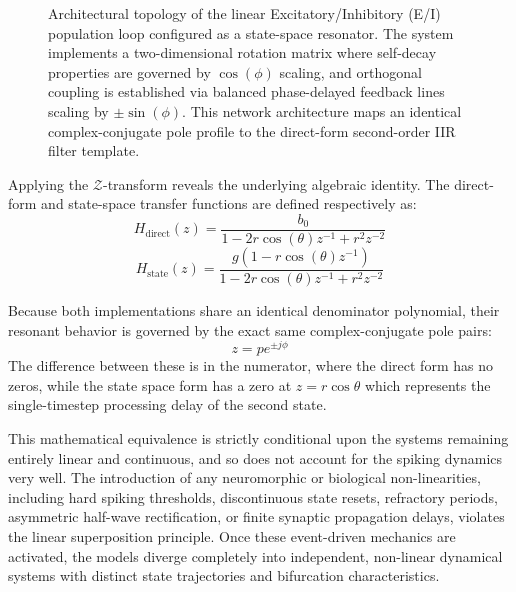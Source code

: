 \begin{figure}[htbp]
    \caption{Architectural topology of the linear Excitatory/Inhibitory (E/I) population loop configured as a state-space resonator. The system implements a two-dimensional rotation matrix where self-decay properties are governed by $\cos(\phi)$ scaling, and orthogonal coupling is established via balanced phase-delayed feedback lines scaling by $\pm\sin(\phi)$. This network architecture maps an identical complex-conjugate pole profile to the direct-form second-order IIR filter template.}
    \label{fig:ei_population_resonator}
\end{figure}


Applying the $\mathcal{Z}$-transform reveals the underlying algebraic identity. The direct-form and state-space transfer functions are defined respectively as:
\begin{equation}
    H_{\text{direct}}(z) = \frac{b_0}{1 - 2r\cos(\theta)z^{-1} + r^2z^{-2}}
\end{equation}
\begin{equation}
    H_{\text{state}}(z) = \frac{g(1 - r\cos(\theta)z^{-1})}{1 - 2r\cos(\theta)z^{-1} + r^2z^{-2}}
\end{equation}

Because both implementations share an identical denominator polynomial, their resonant behavior is governed by the exact same complex-conjugate pole pairs:
\begin{equation}
    z = p e^{\pm j\phi}
\end{equation}
The difference between these is in the numerator, where the direct form has no zeros, while the state space form has a zero at $z=r\cos{\theta}$ which represents the single-timestep processing delay of the second state.  

This mathematical equivalence is strictly conditional upon the systems remaining entirely linear and continuous, and so does not account for the spiking dynamics very well. The introduction of any neuromorphic or biological non-linearities, including hard spiking thresholds, discontinuous state resets, refractory periods, asymmetric half-wave rectification, or finite synaptic propagation delays, violates the linear superposition principle. Once these event-driven mechanics are activated, the models diverge completely into independent, non-linear dynamical systems with distinct state trajectories and bifurcation characteristics.


